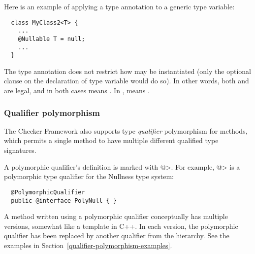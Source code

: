 Here is an example of applying a type annotation to a generic type
variable:

\begin{Verbatim}
  class MyClass2<T> {
    ...
    @Nullable T = null;
    ...
  }
\end{Verbatim}

\noindent
The type annotation does not restrict how  may be instantiated
(only the optional  clause on the declaration of type
variable  would do so).  In other words, both 
 and  are
legal, and in both cases  means .
In , 
 means .





\subsubsection{Qualifier polymorphism\label{qualifier-polymorphism}}

The Checker Framework also supports type \emph{qualifier} polymorphism for methods,
which permits a single method to have multiple different qualified type
signatures.

A polymorphic qualifier's definition is marked with
\<@>.  For example, 
\<@> is a polymorphic type
qualifier for the Nullness type system:

\begin{Verbatim}
  @PolymorphicQualifier
  public @interface PolyNull { }
\end{Verbatim}

A method written using a polymorphic qualifier conceptually has multiple
versions, somewhat like a template in C++.  In each version, the
polymorphic qualifier has been replaced by another qualifier from the
hierarchy.  See the examples in Section~\ref{qualifier-polymorphism-examples}.

